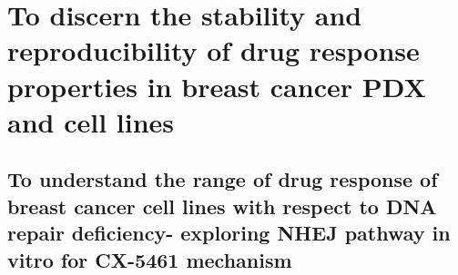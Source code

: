 \chapter{To discern the stability and reproducibility of drug response properties in breast cancer PDX and cell lines} 



\section{To understand the range of drug response of breast cancer cell lines with respect to DNA repair deficiency- exploring NHEJ pathway in vitro for CX-5461 mechanism}
